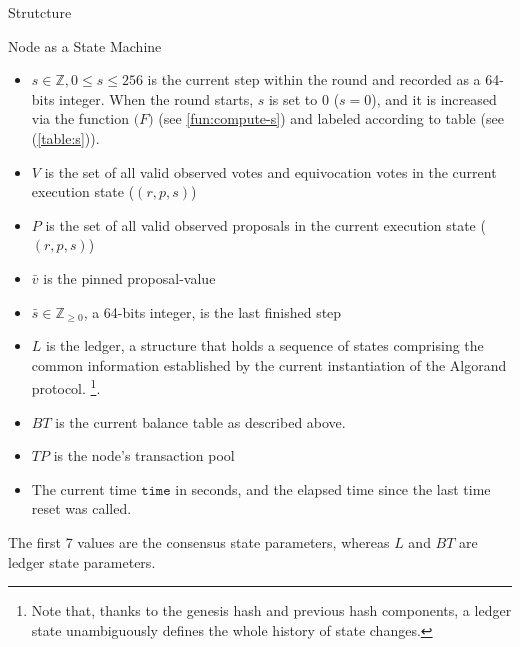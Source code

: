 \documentclass[10pt,a4paper]{article}
\begin{document}
\begin{section}{Strutcture}
\begin{subsection}{Node as a State Machine}
\begin{itemize}
    \item 
    $s\in\mathbb{Z}, 0\le s\le 256$ is the current {\sf step} within the round
    and recorded as a 64-bits integer. When the round starts, $s$ is set to 0 ($s=0$), 
    and it is increased via the function $\mathcal(F)$ (see \ref{fun:compute-s}) and 
    labeled according to table (see (\ref{table:s})).
    
    \item
    $V$ is the set of all {\sf valid observed votes} and 
    {\sf equivocation votes} in the current execution state
    ($(r,p,s)$)
    
    \item
    $P$ is the set of all {\sf valid observed proposals}
    in the current execution state ($(r,p,s)$)
    
    \item
    $\bar{v}$ is the pinned proposal-value
    
    \item
    $\bar{s}\in\mathbb{Z}_{\ge 0}$, a 64-bits integer, is the {\sf last finished step}
    
    \item
    $L$ is the {\sf ledger}, a structure that holds a sequence of states comprising the common
    information established by the current instantiation of the Algorand protocol.
    \footnote{Note that, thanks to the genesis hash and previous 
    hash components, a ledger state unambiguously defines the whole history of state changes.}. 
    
    \item
    $BT$ is the current balance table as described above.
    
    \item
    $TP$ is the node's transaction pool

    \item 
    The current time $\mathtt{time}$ in seconds, and the elapsed time since the last
    time reset was called.
\end{itemize}
The first 7 values are the {\sf consensus state parameters},
whereas $L$ and $BT$ are {\sf ledger state parameters}.


\end{subsection}
\end{section}
\end{document}
